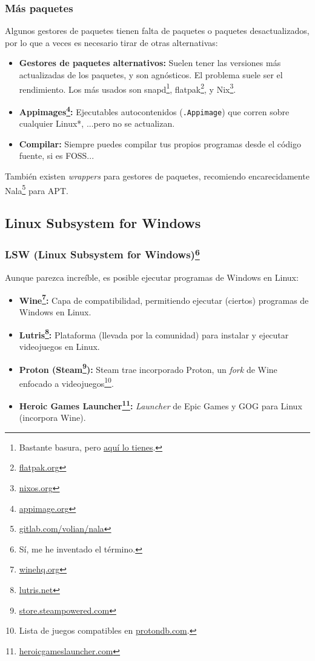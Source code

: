 \documentclass[aspectratio=43]{beamer}
\begin{document}
\begin{frame}
    \frametitle{Más paquetes}
    Algunos gestores de paquetes tienen falta de paquetes o paquetes desactualizados, por lo que a veces es necesario tirar de otras alternativas:

    \begin{itemize}
        \item \textbf{Gestores de paquetes alternativos:} Suelen tener las versiones más actualizadas de los paquetes, y son agnósticos. El problema suele ser el rendimiento. Los más usados son snapd\footnote{Bastante basura, pero \href{https://snapcraft.io/}{aquí lo tienes}.}, flatpak\footnote{\href{https://flatpak.org/}{flatpak.org}}, y Nix\footnote{\href{https://nixos.org/}{nixos.org}}.
        \item \textbf{Appimages\footnote{\href{https://appimage.org/}{appimage.org}}:} Ejecutables autocontenidos (\texttt{.Appimage}) que corren sobre cualquier Linux*, ...pero no se actualizan. 
        \item \textbf{Compilar:} Siempre puedes compilar tus propios programas desde el código fuente, si es FOSS...
    \end{itemize}

    También existen \textit{wrappers} para gestores de paquetes, recomiendo encarecidamente Nala\footnote{\href{https://gitlab.com/volian/nala}{gitlab.com/volian/nala}} para APT.

\end{frame}

\subsection{Linux Subsystem for Windows}
\begin{frame}
    \frametitle{LSW (Linux Subsystem for Windows)\footnote{Sí, me he inventado el término.}}
    Aunque parezca increíble, es posible ejecutar programas de Windows en Linux:
    
    \begin{itemize}
        \item \textbf{Wine\footnote{\href{https://www.winehq.org/}{winehq.org}}:} Capa de compatibilidad, permitiendo ejecutar (ciertos) programas de Windows en Linux.
        \item \textbf{Lutris\footnote{\href{https://lutris.net/}{lutris.net}}:} Plataforma (llevada por la comunidad) para instalar y ejecutar videojuegos en Linux.
        \item \textbf{Proton (Steam\footnote{\href{https://store.steampowered.com/}{store.steampowered.com}}):} Steam trae incorporado Proton, un \textit{fork} de Wine enfocado a videojuegos\footnote{Lista de juegos compatibles en \href{https://www.protondb.com/}{protondb.com}.}.
        \item \textbf{Heroic Games Launcher\footnote{\href{https://heroicgameslauncher.com/}{heroicgameslauncher.com}}:} \textit{Launcher} de Epic Games y GOG para Linux (incorpora Wine).
    \end{itemize}

\end{frame}
\end{document}
